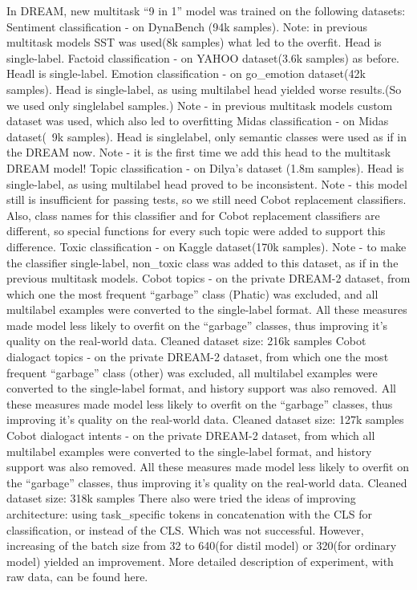 In DREAM, new multitask “9 in 1” model was trained on the following datasets:
Sentiment classification - on DynaBench (94k samples). Note: in previous multitask models SST was used(8k samples) what led to the overfit. Head is single-label.
Factoid classification - on YAHOO dataset(3.6k samples) as before. Headl is single-label.
Emotion classification - on go_emotion dataset(42k samples). Head is single-label, as using multilabel head yielded worse results.(So we used only singlelabel samples.) Note - in previous multitask models custom dataset was used, which also led to overfitting
Midas classification - on Midas dataset(~9k samples). Head is singlelabel, only semantic classes were used as if in the DREAM now. Note - it is the first time we add this head to the multitask DREAM model!
Topic classification - on Dilya’s dataset (1.8m samples). Head is single-label, as using multilabel head proved to be inconsistent. Note - this model still is insufficient for passing tests, so we still need Cobot replacement classifiers. Also, class names for this classifier and for Cobot replacement classifiers are different, so special functions for every such topic were added to support this difference.
Toxic classification - on Kaggle dataset(170k samples). Note - to make the classifier single-label, non_toxic class was added to this dataset, as if in the previous multitask models.
Cobot topics - on the private DREAM-2 dataset, from which one the most frequent “garbage” class (Phatic) was excluded, and all multilabel examples were converted to the single-label format. All these measures made model less likely to overfit on the “garbage” classes, thus improving it’s quality on the real-world data. Cleaned dataset size: 216k samples
Cobot dialogact topics - on the private DREAM-2 dataset, from which one the most frequent “garbage” class (other) was excluded, all multilabel examples were converted to the single-label format, and history support was also removed. All these measures made model less likely to overfit on the “garbage” classes, thus improving it’s quality on the real-world data. Cleaned dataset size: 127k samples
Cobot dialogact intents - on the private DREAM-2 dataset, from which all multilabel examples were converted to the single-label format, and history support was also removed. All these measures made model less likely to overfit on the “garbage” classes, thus improving it’s quality on the real-world data. Cleaned dataset size: 318k samples
There also were tried the ideas of improving architecture: using task_specific tokens in concatenation with the CLS for classification, or instead of the CLS. Which was not successful. However, increasing of the batch size from 32 to 640(for distil model) or 320(for ordinary model) yielded an improvement. 
More detailed description of experiment, with raw data, can be found here.

